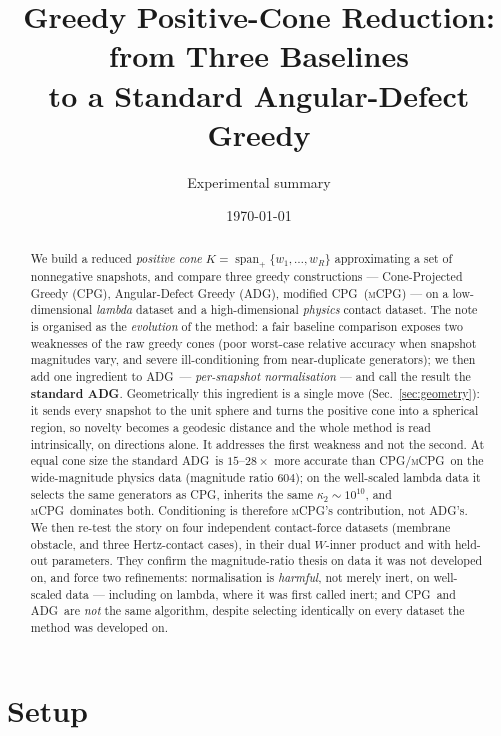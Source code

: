 \documentclass[11pt]{article}
\title{Greedy Positive-Cone Reduction: from Three Baselines\\
       to a Standard Angular-Defect Greedy}
\author{Experimental summary}
\date{\today}
\newcommand{\CPG}{\textsc{CPG}}
\newcommand{\ADG}{\textsc{ADG}}
\newcommand{\mCPG}{\textsc{mCPG}}
\begin{document}
\maketitle

\begin{abstract}
We build a reduced \emph{positive cone}
$K=\operatorname{span}_+\{w_1,\dots,w_R\}$ approximating a set of nonnegative
snapshots, and compare three greedy constructions --- Cone-Projected Greedy
(\CPG), Angular-Defect Greedy (\ADG), modified \CPG\ (\mCPG) --- on a
low-dimensional \emph{lambda} dataset and a high-dimensional \emph{physics}
contact dataset. The note is organised as the \emph{evolution} of the method: a
fair baseline comparison exposes two weaknesses of the raw greedy cones (poor
worst-case relative accuracy when snapshot magnitudes vary, and severe
ill-conditioning from near-duplicate generators); we then add one ingredient to
\ADG\ --- \emph{per-snapshot normalisation} --- and call the result the
\textbf{standard \ADG}. Geometrically this ingredient is a single move
(Sec.~\ref{sec:geometry}): it sends every snapshot to the unit sphere and turns
the positive cone into a spherical region, so novelty becomes a geodesic
distance and the whole method is read intrinsically, on directions alone. It
addresses the first weakness and not the second. At
equal cone size the standard \ADG\ is $15$--$28\times$ more accurate than
\CPG/\mCPG\ on the wide-magnitude physics data (magnitude ratio $604$); on the
well-scaled lambda data it selects the same generators as \CPG, inherits the same
$\kappa_2\sim10^{10}$, and \mCPG\ dominates both. Conditioning is therefore
\mCPG's contribution, not \ADG's. We then re-test the story on four independent
contact-force datasets (membrane obstacle, and three Hertz-contact cases), in
their dual $W$-inner product and with held-out parameters. They confirm the
magnitude-ratio thesis on data it was not developed on, and force two
refinements: normalisation is \emph{harmful}, not merely inert, on well-scaled
data --- including on lambda, where it was first called inert; and \CPG\ and
\ADG\ are \emph{not} the same algorithm, despite selecting identically on every
dataset the method was developed on.
\end{abstract}

\section{Setup}
\end{document}
